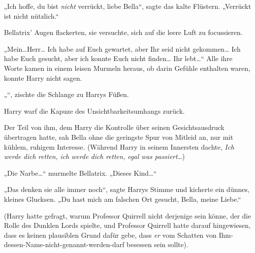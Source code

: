 „Ich hoffe, du bist \emph{nicht} verrückt, liebe Bella“, sagte das kalte Flüstern. „Verrückt ist nicht nützlich.“

Bellatrix' Augen flackerten, sie versuchte, sich auf die leere Luft zu focussieren.

„Mein…Herr… Ich habe auf Euch gewartet, aber Ihr seid nicht gekommen… Ich habe Euch gesucht, aber ich konnte Euch nicht finden… Ihr lebt…“ Alle ihre Worte kamen in einem leisen Murmeln heraus, ob darin Gefühle enthalten waren, konnte Harry nicht sagen.

„“, zischte die Schlange zu Harrys Füßen.

Harry warf die Kapuze des Unsichtbarkeitsumhangs zurück.

Der Teil von ihm, dem Harry die Kontrolle über seinen Gesichtsausdruck übertragen hatte, sah Bella ohne die geringste Spur von Mitleid an, nur mit kühlem, ruhigem Interesse. (Während Harry in seinem Innersten dachte, \emph{Ich werde dich retten, ich werde dich retten, egal was passiert}…)

„Die Narbe…“ murmelte Bellatrix. „Dieses Kind…“

„Das denken sie alle immer noch“, sagte Harrys Stimme und kicherte ein dünnes, kleines Glucksen. „Du hast mich am falschen Ort gesucht, Bella, meine Liebe.“

(Harry hatte gefragt, warum Professor Quirrell nicht derjenige sein könne, der die Rolle des Dunklen Lords spielte, und Professor Quirrell hatte darauf hingewiesen, dass es keinen plausiblen Grund dafür gebe, dass \emph{er} vom Schatten von Ihm-dessen-Name-nicht-genannt-werden-darf besessen sein sollte).

